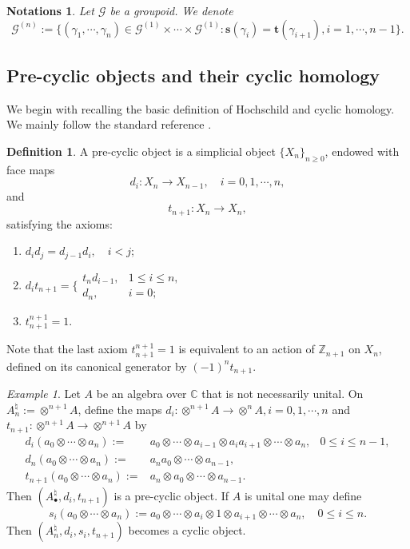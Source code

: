 \documentclass[a4paper]{amsart}
\newcommand{\CC}{\mathbb C}
\newcommand{\ZZ}{\mathbb Z}
\newcommand{\maG}{\mathcal G}
\newcommand{\bs}{\mathbf{s}}
\newcommand{\bt}{\mathbf{t}}
\newcommand\<{\langle}
\renewcommand\>{\rangle}
\newtheorem{nota}[theorem]{Notations}
\theoremstyle{definition}
\newtheorem{dfn}[theorem]{Definition}
\theoremstyle{remark}
\newtheorem{ex}[theorem]{Example}
\begin{document}
\begin{nota}
Let $\maG$ be a groupoid. We denote
$$\maG ^{(n)} := \{(\gamma _1 , \cdots, \gamma_n ) \in \maG^{(1)} \times \cdots \times \maG^{(1)} :
\bs(\gamma_i) = \bt(\gamma _{i+1}), i = 1, \cdots, n-1 \}.$$
\end{nota}


\subsection{Pre-cyclic objects and their cyclic homology}
We begin with recalling the basic definition of Hochschild and cyclic homology.
We mainly follow the standard reference \cite{Loday;Book}.

\begin{dfn}
\label{CyclicObj}
A pre-cyclic object is a simplicial object $\{ X _n \} _{n \geq 0} $, endowed with face maps
$$ d_i : X_n \to X _{n-1}, \quad i = 0, 1, \cdots, n, $$
and
$$t_{n+1} : X_n \to X_n,$$
satisfying the axioms:
\begin{enumerate}
\item
$d_i d_j = d _{j-1} d_i, \quad i < j $;
\item
$d _i t _{n+1} = \big\{
\begin{array}{ll}
t _n d _{i-1}, & 1 \leq i \leq n, \\
d _n, & i = 0 ;
\end{array}
$
\item
$t_{n+1}^{n+1} = 1$.
\end{enumerate}
Note that the last axiom $t_{n+1}^{n+1} = 1$ is equivalent to an action of $\ZZ _{n+1}$ on $X_n$,
defined on its canonical generator by $(-1)^n t_{n+1}$.
\end{dfn}

\begin{ex}
Let $A$ be an algebra over $\CC$ that is not necessarily unital.
On $A^\natural _n := \otimes ^{n+1} A$, define the maps
$ d_i : \otimes ^{n+1} A \to \otimes ^{n} A, i = 0, 1, \cdots, n $ and $t_{n+1} : \otimes ^{n+1} A \to \otimes ^{n+1} A$
by
\begin{align*}
d_i (a_0 \otimes \cdots \otimes a_n)
:=& a_0 \otimes \cdots \otimes a_{i-1} \otimes a_i a_{i+1} \otimes \cdots \otimes a_n, & 0 \leq i \leq n-1, \\
d_n (a_0 \otimes \cdots \otimes a_n)
:=& a_n a_0 \otimes \cdots \otimes a _{n-1}, & \\
t _{n+1} (a_0 \otimes \cdots \otimes a_n)
:=& a_n \otimes a_0 \otimes \cdots \otimes a_{n-1}.
\end{align*}
Then $(A^\natural _\bullet, d_i, t _{n+1}) $ is a pre-cyclic object.
If $A$ is unital one may define
$$s_i (a_0 \otimes \cdots \otimes a_n)
:= a_0 \otimes \cdots \otimes a_i \otimes 1 \otimes a_{i+1} \otimes \cdots \otimes a_n, \quad 0 \leq i \leq n.$$
Then $(A^\natural _n , d_i , s_i , t_{n+1})$ becomes a cyclic object.
\end{ex}
\end{document}
